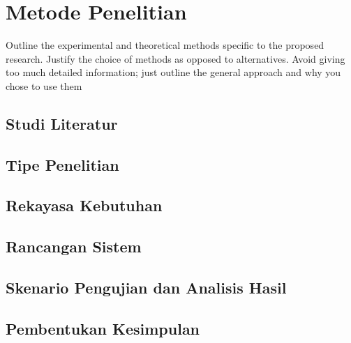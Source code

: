 \section{Metode Penelitian}
Outline the experimental and theoretical methods specific to the proposed research. Justify the choice of methods as opposed to alternatives. Avoid giving too much detailed information; just outline the general approach and why you chose to use them

\subsection{Studi Literatur}

\subsection{Tipe Penelitian}

\subsection{Rekayasa Kebutuhan}

\subsection{Rancangan Sistem}

\subsection{Skenario Pengujian dan Analisis Hasil}

\subsection{Pembentukan Kesimpulan}